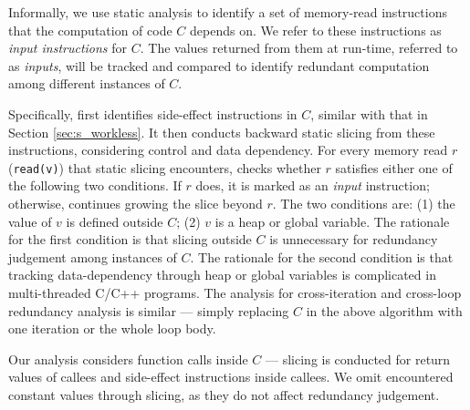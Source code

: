 Informally, we use static analysis to identify a set of 
memory-read instructions that the computation of code $C$
depends on. We refer
to these instructions as \textit{input instructions} for $C$. 
The values returned
from them at run-time, referred to as \textit{inputs}, 
will be tracked and compared to identify
redundant computation among different instances of $C$.

Specifically, \Tool first identifies side-effect instructions in $C$,
similar with that in Section \ref{sec:s_workless}. 
It then conducts 
backward static slicing 
from these instructions, considering control and data
dependency. For every memory read $r$ 
(\texttt{read(v)}) that static slicing encounters, \Tool checks whether $r$
satisfies either one of the following two conditions. 
If $r$ does, it is marked as
an \textit{input} instruction; otherwise, \Tool continues growing the
slice beyond $r$.
The two conditions are:
(1) the value of $v$ is defined outside $C$;
(2) $v$ is a heap or global variable.
The rationale for the first condition is that slicing outside $C$ is
unnecessary for redundancy judgement among instances of $C$.
The rationale for the second condition is that tracking data-dependency
through heap or global variables is complicated in multi-threaded C/C++
programs.
The analysis for cross-iteration and cross-loop redundancy analysis is similar
--- simply replacing $C$ in the above algorithm with one iteration or
the whole loop body.


Our analysis considers function calls inside $C$ --- slicing is conducted
for return values of callees and side-effect instructions
inside callees. 
We omit encountered constant values through slicing, as they do not affect redundancy judgement. 


